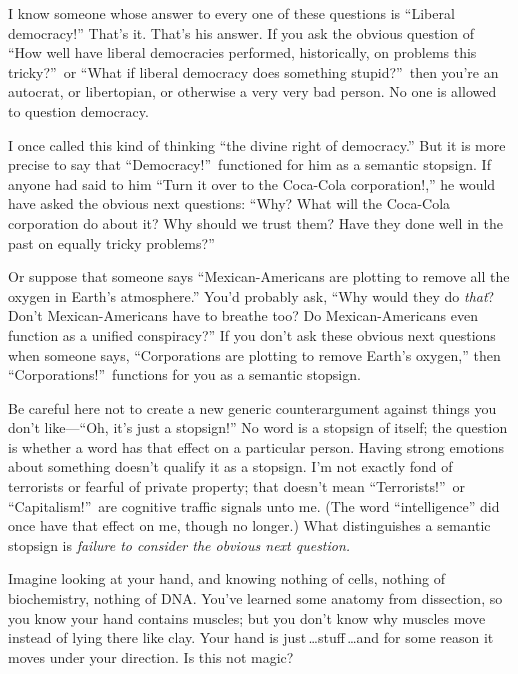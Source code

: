 {
 I know someone whose answer to every one of these questions is
``Liberal democracy!''
That's it. That's his answer. If you
ask the obvious question of ``How well have liberal
democracies performed, historically, on problems this
tricky?''~or ``What if liberal
democracy does something stupid?''~then
you're an autocrat, or libertopian, or otherwise a very
very bad person. No one is allowed to question democracy.}

{
 I once called this kind of thinking ``the divine
right of democracy.'' But it is more precise to say
that ``Democracy!''~functioned for
him as a semantic stopsign. If anyone had said to him
``Turn it over to the Coca-Cola
corporation!,'' he would have asked the obvious next
questions: ``Why? What will the Coca-Cola corporation
do about it? Why should we trust them? Have they done well in the past
on equally tricky problems?''}

{
 Or suppose that someone says ``Mexican-Americans
are plotting to remove all the oxygen in Earth's
atmosphere.'' You'd probably ask,
``Why would they do \textit{that}?
Don't Mexican-Americans have to breathe too? Do
Mexican-Americans even function as a unified
conspiracy?'' If you don't ask these
obvious next questions when someone says,
``Corporations are plotting to remove
Earth's oxygen,'' then
``Corporations!''~functions for you
as a semantic stopsign.}

{
 Be careful here not to create a new generic counterargument
against things you don't like---``Oh,
it's just a stopsign!'' No word is a
stopsign of itself; the question is whether a word has that effect on a
particular person. Having strong emotions about something
doesn't qualify it as a stopsign. I'm
not exactly fond of terrorists or fearful of private property; that
doesn't mean
``Terrorists!''~or
``Capitalism!''~are cognitive
traffic signals unto me. (The word
``intelligence'' did once have that
effect on me, though no longer.) What distinguishes a semantic stopsign
is \textit{failure to consider the obvious next question.}}

\myendsectiontext

\label{matmq}

{
 Imagine looking at your hand, and knowing nothing of cells,
nothing of biochemistry, nothing of DNA. You've learned
some anatomy from dissection, so you know your hand contains muscles;
but you don't know why muscles move instead of lying
there like clay. Your hand is just\,\ldots stuff\,\ldots and for some
reason it moves under your direction. Is this not magic?}

